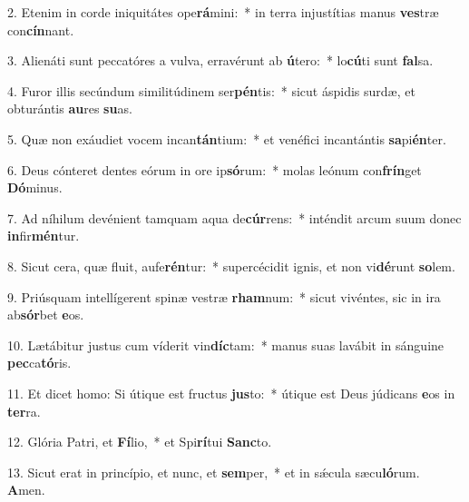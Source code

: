 2. Etenim in corde iniquitátes ope\textbf{rá}mini:~*  in terra injustítias manus \textbf{ves}træ con\textbf{cín}nant.\

3. Alienáti sunt peccatóres a vulva, erravérunt ab \textbf{ú}tero:~*  lo\textbf{cú}ti sunt \textbf{fal}sa.\

4. Furor illis secúndum similitúdinem ser\textbf{pén}tis:~*  sicut áspidis surdæ, et obturántis \textbf{au}res \textbf{su}as.\

5. Quæ non exáudiet vocem incan\textbf{tán}tium:~*  et venéfici incantántis \textbf{sa}pi\textbf{én}ter.\

6. Deus cónteret dentes eórum in ore ip\textbf{só}rum:~*  molas leónum con\textbf{frín}get \textbf{Dó}minus.\

7. Ad níhilum devénient tamquam aqua de\textbf{cúr}rens:~*  inténdit arcum suum donec \textbf{in}fir\textbf{mén}tur.\

8. Sicut cera, quæ fluit, aufe\textbf{rén}tur:~*  supercécidit ignis, et non vi\textbf{dé}runt \textbf{so}lem.\

9. Priúsquam intellígerent spinæ vestræ \textbf{rham}num:~*  sicut vivéntes, sic in ira ab\textbf{sór}bet \textbf{e}os.\

10. Lætábitur justus cum víderit vin\textbf{díc}tam:~*  manus suas lavábit in sánguine \textbf{pec}ca\textbf{tó}ris.\

11. Et dicet homo: Si útique est fructus \textbf{jus}to:~*  útique est Deus júdicans \textbf{e}os in \textbf{ter}ra.\

12. Glória Patri, et \textbf{Fí}lio,~*  et Spi\textbf{rí}tui \textbf{Sanc}to.\

13. Sicut erat in princípio, et nunc, et \textbf{sem}per,~*  et in sǽcula sæcu\textbf{ló}rum. \textbf{A}men.\

